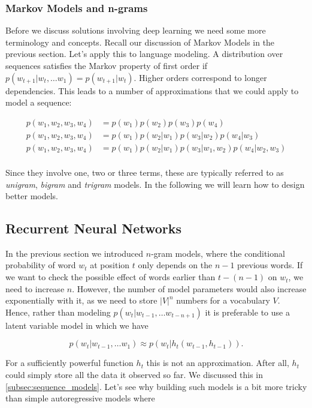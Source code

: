 \subsubsection{Markov Models and n-grams}

Before we discuss solutions involving deep learning we need some more terminology and concepts. Recall our discussion of Markov Models in the previous section. Let’s apply this to language modeling. A distribution over sequences satisfies the Markov property of first order if $p(w_{t+1}|w_t, \ldots w_1) = p(w_{t+1}|w_t)$. Higher orders correspond to longer dependencies. This leads to a number of approximations that we could apply to model a sequence:

$$
\begin{aligned}
p(w_1, w_2, w_3, w_4) &=  p(w_1) p(w_2) p(w_3) p(w_4)\\
p(w_1, w_2, w_3, w_4) &=  p(w_1) p(w_2 | w_1) p(w_3 | w_2) p(w_4 | w_3)\\
p(w_1, w_2, w_3, w_4) &=  p(w_1) p(w_2 | w_1) p(w_3 | w_1, w_2) p(w_4 | w_2, w_3)\\
\end{aligned}
$$

Since they involve one, two or three terms, these are typically referred to as \textit{unigram}, \textit{bigram} and \textit{trigram} models. In the following we will learn how to design better models.

\subsection{Recurrent Neural Networks}

In the previous section we introduced $n$-gram models, where the conditional probability of word $w_t$ at position $t$ only depends on the $n-1$ previous words. If we want to check the possible effect of words earlier than $t-(n-1)$ on $w_t$, we need to increase $n$. However, the number of model parameters would also increase exponentially with it, as we need to store $|V|^n$ numbers for a vocabulary $V$. Hence, rather than modeling $p(w_t|w_{t-1}, \ldots w_{t-n+1})$ it is preferable to use a latent variable model in which we have

$$p(w_t|w_{t-1}, \ldots w_1) \approx p(w_t|h_t(w_{t-1}, h_{t-1})).$$

For a sufficiently powerful function $h_t$ this is not an approximation. After
all, $h_t$ could simply store all the data it observed so far. We discussed this
in \cref{subsec:sequence_models}. Let's see why building such models is a bit more tricky than simple autoregressive models where

